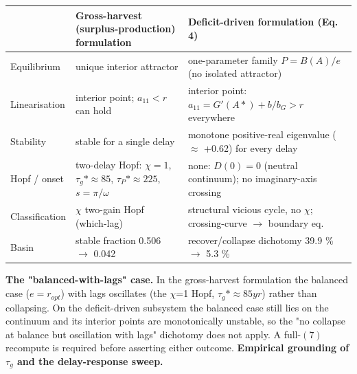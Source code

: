 \documentclass[11pt]{article}
\begin{document}
\begin{table}[htbp]
\centering
\small
\begin{tabularx}{\textwidth}{l>{\raggedright\arraybackslash}X>{\raggedright\arraybackslash}X}
\toprule
 & Gross-harvest (surplus-production) formulation & Deficit-driven formulation (Eq. 4) \\
\midrule
Equilibrium & unique interior attractor & one-parameter family $P = B(A)/e$ (no isolated attractor) \\
Linearisation & interior point; $a_{11} < r$ can hold & interior point: $a_{11} = G'(A*) + b/b_{G} > r$ everywhere \\
Stability & stable for a single delay & monotone positive-real eigenvalue (\ensuremath{\approx{}} +0.62) for every delay \\
Hopf / onset & two-delay Hopf: $\chi{}=1$, $\tau{}_{g}*\approx{}85$, $\tau{}_{P}*\approx{}225$, $s=\pi{}/\omega{}$ & none: $D(0)=0$ (neutral continuum); no imaginary-axis crossing \\
Classification & $\chi{}$ two-gain Hopf (which-lag) & structural vicious cycle, no $\chi{}$; crossing-curve \ensuremath{\to{}} boundary eq. \\
Basin & stable fraction 0.506 \ensuremath{\to{}} 0.042 & recover/collapse dichotomy 39.9 \% \ensuremath{\to{}} 5.3 \% \\
\bottomrule
\end{tabularx}
\end{table}

\textbf{The "balanced-with-lags" case.} In the gross-harvest formulation the balanced case ($e = r_{opt}$) with lags oscillates (the \ensuremath{\chi{}}=1 Hopf, $\tau{}_{g}* \approx{} 85 yr$) rather than collapsing. On the deficit-driven subsystem the balanced case still lies on the continuum and its interior points are monotonically unstable, so the "no collapse at balance but oscillation with lags" dichotomy does not apply. A full-$(7)$ recompute is required before asserting either outcome. \textbf{Empirical grounding of $\tau{}_{g}$ and the delay-response sweep.}
\end{document}
